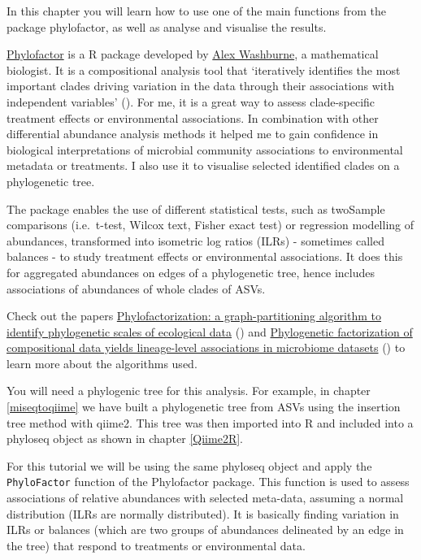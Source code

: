 \documentclass[
]{book}
\begin{document}
In this chapter you will learn how to use one of the main functions from the package phylofactor, as well as analyse and visualise the results.

\href{https://github.com/reptalex/phylofactor}{Phylofactor} is a R package developed by \href{https://github.com/reptalex}{Alex Washburne}, a mathematical biologist. It is a compositional analysis tool that `iteratively identifies the most important clades driving variation in the data through their associations with independent variables' (\citet{Washburne2017}). For me, it is a great way to assess clade-specific treatment effects or environmental associations. In combination with other differential abundance analysis methods it helped me to gain confidence in biological interpretations of microbial community associations to environmental metadata or treatments. I also use it to visualise selected identified clades on a phylogenetic tree.

The package enables the use of different statistical tests, such as twoSample comparisons (i.e.~t-test, Wilcox text, Fisher exact test) or regression modelling of abundances, transformed into isometric log ratios (ILRs) - sometimes called balances - to study treatment effects or environmental associations. It does this for aggregated abundances on edges of a phylogenetic tree, hence includes associations of abundances of whole clades of ASVs.

Check out the papers \href{https://www.biorxiv.org/content/10.1101/235341v2}{Phylofactorization: a graph-partitioning algorithm to identify phylogenetic scales of ecological data} (\citet{Washburne2019a}) and \href{https://peerj.com/articles/2969/}{Phylogenetic factorization of compositional data yields lineage-level associations in microbiome datasets} (\citet{Washburne2017}) to learn more about the algorithms used.

You will need a phylogenic tree for this analysis. For example, in chapter \ref{miseqtoqiime} we have built a phylogenetic tree from ASVs using the insertion tree method with qiime2. This tree was then imported into R and included into a phyloseq object as shown in chapter \ref{Qiime2R}.

For this tutorial we will be using the same phyloseq object and apply the \texttt{PhyloFactor} function of the Phylofactor package. This function is used to assess associations of relative abundances with selected meta-data, assuming a normal distribution (ILRs are normally distributed). It is basically finding variation in ILRs or balances (which are two groups of abundances delineated by an edge in the tree) that respond to treatments or environmental data.
\end{document}
